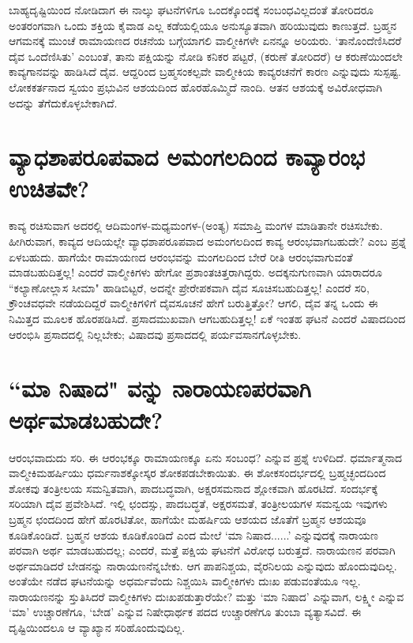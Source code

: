 ಬಾಹ್ಯದೃಷ್ಟಿಯಿಂದ ನೋಡಿದಾಗ ಈ ನಾಲ್ಕು ಘಟನೆಗಳಿಗೂ ಒಂದಕ್ಕೊಂದಕ್ಕೆ ಸಂಬಂಧವಿಲ್ಲದಂತೆ ತೋರಿದರೂ ಅಂತರಂಗವಾಗಿ ಒಂದು ಶಕ್ತಿಯ ಕೈವಾಡ ಎಲ್ಲ ಕಡೆಯಲ್ಲಿಯೂ ಅನುಸ್ಯೂತವಾಗಿ ಹರಿಯುವುದು ಕಾಣುತ್ತದೆ. ಬ್ರಹ್ಮನ ಆಗಮನಕ್ಕೆ ಮುಂಚೆ ರಾಮಾಯಣದ ರಚನೆಯ ಬಗ್ಗೆಯಾಗಲಿ ವಾಲ್ಮೀಕಿಗಳೇ ಏನನ್ನೂ ಅರಿಯರು. `ತಾನೊಂದೆಣಿಸಿದರೆ ದೈವ ಒಂದೆಣಿಸಿತು' ಎಂಬಂತೆ, ತಾನು ಪಕ್ಷಿಯನ್ನು ನೋಡಿ ಕನಿಕರ ಪಟ್ಟರೆ, (ಕರುಣೆ ತೋರಿದರೆ) ಆ ಕರುಣೆಯಿಂದಲೇ ಕಾವ್ಯಗಾನವನ್ನು ಹಾಡಿಸಿದೆ ದೈವ. ಆದ್ದರಿಂದ ಬ್ರಹ್ಮಸಂಕಲ್ಪವೇ ವಾಲ್ಮೀಕಿಯ ಕಾವ್ಯರಚನೆಗೆ ಕಾರಣ ಎನ್ನುವುದು ಸುಸ್ಪಷ್ಟ. ಲೋಕಕರ್ತನಾದ ಸ್ವಯಂ ಪ್ರಭುವಿನ ಆಶಯದಿಂದ ಹೊರಹೊಮ್ಮಿದೆ ನಾಂದಿ. ಆತನ ಆಶಯಕ್ಕೆ ಅವಿರೋಧವಾಗಿ ಅದನ್ನು ತೆಗೆದುಕೊಳ್ಳಬೇಕಾಗಿದೆ. 

\section*{ವ್ಯಾಧಶಾಪರೂಪವಾದ ಅಮಂಗಲದಿಂದ ಕಾವ್ಯಾರಂಭ ಉಚಿತವೇ?} 

ಕಾವ್ಯ ರಚಿಸುವಾಗ ಅದರಲ್ಲಿ ಆದಿಮಂಗಳ-ಮಧ್ಯಮಂಗಳ-(ಅಂತ್ಯ) ಸಮಾಪ್ತಿ ಮಂಗಳ ಮಾಡಿತಾನೇ ರಚಿಸಬೇಕು. ಹೀಗಿರುವಾಗ, ಕಾವ್ಯದ ಆದಿಯಲ್ಲೇ ವ್ಯಾಧಶಾಪರೂಪವಾದ ಅಮಂಗಲದಿಂದ ಕಾವ್ಯ ಆರಂಭವಾಗಬಹುದೇ? ಎಂಬ ಪ್ರಶ್ನೆ ಏಳಬಹುದು. ಹಾಗೆಯೇ ರಾಮಾಯಣದ ಆರಂಭವನ್ನು ಮಂಗಲದಿಂದ ಬೇರೆ ರೀತಿ ಆರಂಭವಾಗುವಂತೆ ಮಾಡಬಹುದಿತ್ತಲ್ಲ! ಎಂದರೆ ವಾಲ್ಮೀಕಿಗಳು ಹೇಗೋ ಪ್ರಶಾಂತಚಿತ್ತರಾಗಿದ್ದರು. ಅದಕ್ಕನುಗುಣವಾಗಿ ಯಾರಾದರೂ ``ಕಲ್ಯಾಣೋಲ್ಲಾಸ ಸೀಮಾ" ಹಾಡಿಬಿಟ್ಟರೆ, ಅದನ್ನೇ ಪ್ರೇರೇಪಕವಾಗಿ ದೈವ ಸೂಚಿಸಬಹುದಿತ್ತಲ್ಲ! ಎಂದರೆ ಸರಿ, ಕ್ರೌಂಚವಧವೇ ನಡೆಯದಿದ್ದರೆ ವಾಲ್ಮೀಕಿಗಳಿಗೆ ದೈವಸೂಚನೆ ಹೇಗೆ ಬರುತ್ತಿತ್ತೋ? ಆಗಲಿ, ದೈವ ತನ್ನ ಒಂದು ಈ ನಿಮಿತ್ತದ ಮೂಲಕ ಹೊರಪಡಿಸಿದೆ. ಪ್ರಸಾದಮುಖವಾಗಿ ಆಗಬಹುದಿತ್ತಲ್ಲ! ಏಕೆ ಇಂತಹ ಘಟನೆ ಎಂದರೆ ವಿಷಾದದಿಂದ ಆರಂಭಿಸಿ ಪ್ರಸಾದದಲ್ಲಿ ನಿಲ್ಲಬೇಕು; ವಿಷಾದವು ಪ್ರಸಾದದಲ್ಲಿ ಪರ್ಯವಸಾನಗೊಳ್ಳಬೇಕು. 

\section*{``ಮಾ ನಿಷಾದ" ವನ್ನು ನಾರಾಯಣಪರವಾಗಿ ಅರ್ಥಮಾಡಬಹುದೇ?} 

ಆರಂಭವಾದುದು ಸರಿ. ಈ ಆರಂಭಕ್ಕೂ ರಾಮಾಯಣಕ್ಕೂ ಏನು ಸಂಬಂಧ? ಎನ್ನುವ ಪ್ರಶ್ನೆ ಉಳಿದಿದೆ. ಧರ್ಮಾತ್ಮನಾದ ವಾಲ್ಮೀಕಿಮಹರ್ಷಿಯು ಧರ್ಮನಾಶಕ್ಕೋಸ್ಕರ ಶೋಕಪಡಬೇಕಾಯಿತು. ಈ ಶೋಕಸಂದರ್ಭದಲ್ಲಿ ಬ್ರಹ್ಮಚ್ಛಂದದಿಂದ ಶೋಕವು ತಂತ್ರೀಲಯ ಸಮನ್ವಿತವಾಗಿ, ಪಾದಬದ್ಧವಾಗಿ, ಅಕ್ಷರಸಮನಾದ ಶ್ಲೋಕವಾಗಿ ಹೊರಟಿದೆ. ಸಂದರ್ಭಕ್ಕೆ ಸರಿಯಾಗಿ ದೈವ ಪ್ರವೇಶಿಸಿದೆ. ಇಲ್ಲಿ ಛಂದಸ್ಸು, ಪಾದಬದ್ಧತೆ, ಅಕ್ಷರಸಮತೆ, ತಂತ್ರೀಲಯಗಳ ಸಮನ್ವಯ ಇವುಗಳು ಬ್ರಹ್ಮನ ಛಂದದಿಂದ ಹೇಗೆ ಹೊರಟಿತೋ, ಹಾಗೆಯೇ ಮಹರ್ಷಿಯ ಆಶಯದ ಜೊತೆಗೆ ಬ್ರಹ್ಮನ ಆಶಯವೂ ಕೂಡಿಕೊಂಡಿದೆ. ಬ್ರಹ್ಮನ ಆಶಯ ಕೂಡಿಕೊಂಡಿದೆ ಎಂದ ಮೇಲೆ `ಮಾ ನಿಷಾದ......' ಎನ್ನುವುದಕ್ಕೆ ನಾರಾಯಣ ಪರವಾಗಿ ಅರ್ಥ ಮಾಡಬಹುದಲ್ಲ; ಎಂದರೆ, ಮತ್ತೆ ಪಕ್ಷಿಯ ಘಟನೆಗೆ ವಿರೋಧ ಬರುತ್ತದೆ. ನಾರಾಯಣನ ಪರವಾಗಿ ಅರ್ಥಮಾಡಿದರೆ ಬೇಡನನ್ನು ನಾರಾಯಣನೆನ್ನಬೇಕು. ಆಗ ಪಾಪನಿಶ್ಚಯ, ವೈರನಿಲಯ ಎನ್ನುವುದು ಹೊಂದುವುದಿಲ್ಲ. ಅಂತೆಯೇ ನಡೆದ ಘಟನೆಯನ್ನು ಅಧರ್ಮವೆಂದು ನಿಶ್ಚಯಿಸಿ ವಾಲ್ಮೀಕಿಗಳು ದುಃಖ ಪಡುವಂತೆಯೂ ಇಲ್ಲ. ನಾರಾಯಣನನ್ನು ಸ್ತುತಿಸಿದರೆ ವಾಲ್ಮೀಕಿಗಳು ದುಃಖಪಡುತ್ತಾರೆಯೇ? ಮತ್ತು `ಮಾ ನಿಷಾದ' ಎನ್ನುವಾಗ, ಲಕ್ಷ್ಮೀ ಎನ್ನುವ `ಮಾ' ಉಚ್ಚಾರಣೆಗೂ, `ಬೇಡ' ಎನ್ನುವ ನಿಷೇಧಾರ್ಥಕ ಪದದ ಉಚ್ಚಾರಣೆಗೂ ತುಂಬಾ ವ್ಯತ್ಯಾಸವಿದೆ. ಈ ದೃಷ್ಟಿಯಿಂದಲೂ ಆ ವ್ಯಾಖ್ಯಾನ ಸರಿಹೊಂದುವುದಿಲ್ಲ. 

